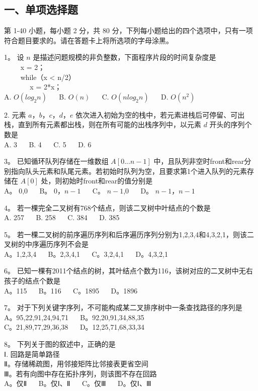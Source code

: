 
\subsection{一、单项选择题}
第 1-40 小题，每小题 2 分，共 80 分，下列每小题给出的四个选项中，只有一项符合题目要求的。请在答题卡上将所选项的字母涂黑。

1。 设 $n$ 是描述问题规模的非负整数，下面程序片段的时间复杂度是  \\
$\qquad$ x = 2； \\
$\qquad$ while（x < n/2） \\
$\qquad$ $\quad$ x = 2*x； \\
A. $O(log_2n)$ $\quad$ B. $O(n)$ $\quad$ C. $O(nlog_2n)$ $\quad$ D. $O(n^2)$

2. 元素 $a$，$b$，$c$，$d$，$e$ 依次进入初始为空的栈中，若元素进栈后可停留、可出栈，直到所有元素都出栈，则在所有可能的出栈序列中，以元素 $d$ 开头的序列个数是  \\
A. 3  $\quad$  B. 4  $\quad$  C. 5  $\quad$  D. 6

3。 已知循环队列存储在一维数组 $A[0...n-1]$ 中，且队列非空时front和rear分别指向队头元素和队尾元素。若初始时队列为空，且要求第1个进入队列的元素存储在 $A[0]$ 处，则初始时front和rear的值分别是 \\
A。 $0$,$0$  $\quad$ B。 $0$，$n-1$ $\quad$ C。 $n-1$,$0$ $\quad$ D。 $n-1$，$n-1$ 

4。 若一棵完全二叉树有768个结点，则该二叉树中叶结点的个数是 \\
A. 257 $\quad$ B. 258 $\quad$ C. 384 $\quad$ D. 385

5。 若一棵二叉树的前序遍历序列和后序遍历序列分别为1,2,3,4和4,3,2,1，则该二叉树的中序遍历序列不会是 \\
A。1,2,3,4 $\quad$ B。2,3,4,1 $\quad$ C。3,2,4,1 $\quad$ D。4,3,2,1

6。 已知一棵有2011个结点的树，其叶结点个数为116，该树对应的二叉树中无右孩子的结点个数是 \\
A。115 $\quad$ B。116 $\quad$ C。1895 $\quad$ D。1896

7。 对于下列关键字序列，不可能构成某二叉排序树中一条查找路径的序列是 \\
A。95,22,91,24,94,71 $\quad$ B。92,20,91,34,88,35 \\
C。21,89,77,29,36,38 $\quad$ D。12,25,71,68,33,34

8。 下列关于图的叙述中，正确的是 \\
Ⅰ. 回路是简单路径 \\
Ⅱ。存储稀疏图，用邻接矩阵比邻接表更省空间 \\
Ⅲ。若有向图中存在拓扑序列，则该图不存在回路 \\
A。仅Ⅱ $\quad$ B。仅Ⅰ、Ⅱ $\quad$  C。仅Ⅲ $\quad$ D。仅Ⅰ、Ⅲ


